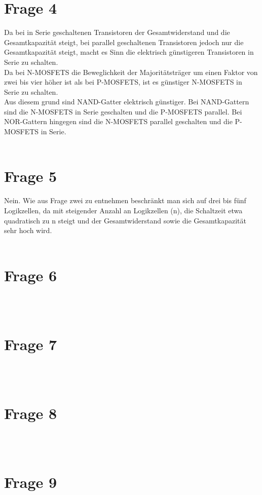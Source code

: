 \documentclass[a4paper]{scrartcl}
\begin{document}
\section*{Frage 4}
Da bei in Serie geschaltenen Transistoren der Gesamtwiderstand und die Gesamtkapazität steigt, bei parallel geschaltenen Transistoren jedoch nur die Gesamtkapazität steigt, macht es Sinn die elektrisch günstigeren Transistoren in Serie zu schalten.\\
Da bei N-MOSFETS die Beweglichkeit der Majoritätsträger um einen Faktor von zwei bis vier höher ist als bei P-MOSFETS, ist es günstiger N-MOSFETS in Serie zu schalten.\\
Aus diesem grund sind NAND-Gatter elektrisch günstiger. Bei NAND-Gattern sind die N-MOSFETS in Serie geschalten und die P-MOSFETS parallel. Bei NOR-Gattern hingegen sind die N-MOSFETS parallel geschalten und die P-MOSFETS in Serie.
~\\
~\\
\section*{Frage 5}
Nein. Wie aus Frage zwei zu entnehmen beschränkt man sich auf drei bis fünf Logikzellen, da mit steigender Anzahl an Logikzellen (n), die Schaltzeit etwa quadratisch zu n steigt und der Gesamtwiderstand sowie die Gesamtkapazität sehr hoch wird.
~\\
~\\
\section*{Frage 6}

~\\
~\\
\section*{Frage 7}

~\\
~\\
\section*{Frage 8}

~\\
~\\
\section*{Frage 9}

~\\
~\\
\end{document}
